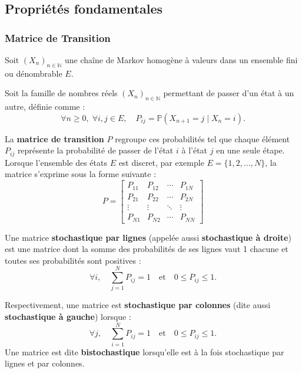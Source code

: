 \documentclass{article}
\begin{document}
\newpage %
\subsection{Propriétés fondamentales}


\subsubsection{Matrice de Transition}

\begin{tcolorbox}[colback=white,colframe=red!80!black,title=Matrice de Transition]
Soit $(X_n)_{n \in \mathbb{N}}$ une chaîne de Markov homogène à valeurs dans un ensemble fini ou dénombrable $E$.

Soit la famille de nombres réels $(X_n)_{n \in \mathbb{N}}$ permettant de passer d'un état à un autre, définie comme :
\[
\forall n \geq 0,\; \forall i,j \in E,\quad P_{ij} = \mathbb{P}(X_{n+1} = j \mid X_n = i).
\]

La \textbf{matrice de transition} $P$ regroupe ces probabilités tel que chaque élément $P_{ij}$ représente la probabilité de passer de l'état $i$ à l'état $j$ en une seule étape.
Lorsque l'ensemble des états $E$ est discret, par exemple $E = \{1, 2, \dots, N\}$, la matrice s'exprime sous la forme suivante :
\[
P = \begin{bmatrix}
P_{11} & P_{12} & \cdots & P_{1N}\\[1mm]
P_{21} & P_{22} & \cdots & P_{2N}\\[1mm]
\vdots & \vdots & \ddots & \vdots\\[1mm]
P_{N1} & P_{N2} & \cdots & P_{NN}
\end{bmatrix}
\]

\end{tcolorbox}

\begin{tcolorbox}[colback=white,colframe=blue!80!black,title=Matrice stochastique par lignes/colonnes]
Une matrice \textbf{stochastique par lignes} (appelée aussi \textbf{stochastique à droite}) est une matrice dont la somme des probabilités de ses lignes vaut 1 chacune et toutes ses probabilités sont positives :
\[
\forall i, \quad \sum_{j=1}^{N} P_{ij} = 1 \quad \text{et} \quad 0 \leq P_{ij} \leq 1.
\]

Respectivement, une matrice est \textbf{stochastique par colonnes} (dite aussi \textbf{stochastique à gauche}) lorsque :
\[
\forall j, \quad \sum_{i=1}^{N} P_{ij} = 1 \quad \text{et} \quad 0 \leq P_{ij} \leq 1.
\]
Une matrice est dite \textbf{bistochastique} lorsqu'elle est à la fois stochastique par lignes et par colonnes.
\end{tcolorbox}
\end{document}
